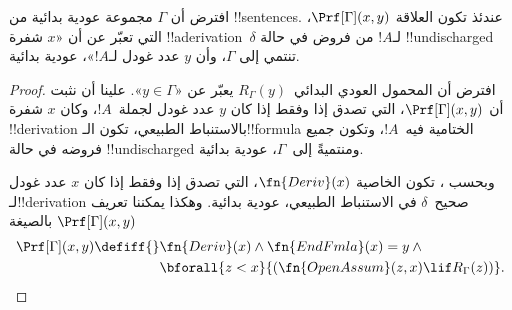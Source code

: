 \documentclass[../../../include/open-logic-section]{subfiles}
\begin{document}
\begin{prop}
  افترض أن $\Gamma$ مجموعة عودية بدائية من !!{sentence}s. عندئذ تكون
  العلاقة $\Prf[\Gamma](x,y)$، التي تعبّر عن أن «$x$ شفرة
  !!a{derivation}~$\delta$ لـ$!A$ من فروض في حالة !!{undischarged} تنتمي إلى
  $\Gamma$، وأن $y$ عدد غودل لـ$!A$»، عودية بدائية.
\end{prop}

\begin{proof}
  افترض أن المحمول العودي البدائي~$R_\Gamma(y)$ يعبّر عن
  «$y\in\Gamma$». علينا أن نثبت أن $\Prf[\Gamma](x,y)$، التي تصدق إذا
  وفقط إذا كان $y$ عدد غودل لجملة~$!A$، وكان $x$ شفرة !!{derivation}
  بالاستنباط الطبيعي، تكون الـ!!{formula} الختامية فيه~$!A$، وتكون جميع
  فروضه في حالة !!{undischarged} ومنتميةً إلى~$\Gamma$، عودية بدائية.

  وبحسب ، تكون الخاصية $\fn{Deriv}(x)$، التي تصدق
  إذا وفقط إذا كان $x$ عدد غودل لـ!!{derivation} صحيح~$\delta$ في
  الاستنباط الطبيعي، عودية بدائية. وهكذا يمكننا تعريف
  $\Prf[\Gamma](x,y)$ بالصيغة
  \begin{align*}
    \Prf[\Gamma](x, y) \defiff {}
    & \fn{Deriv}(x) \land \fn{EndFmla}(x) = y \land {} \\
    & \bforall{z < x}{(\fn{OpenAssum}(z, x) \lif R_\Gamma(z))}.
  \end{align*}
\end{proof}
\end{document}
